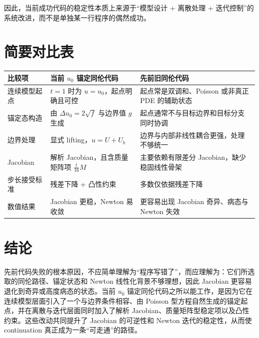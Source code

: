 \documentclass[11pt,a4paper]{article}
\begin{document}
因此，当前成功代码的稳定性本质上来源于“模型设计 + 离散处理 + 迭代控制”的系统改进，而不是单独某一行程序的偶然成功。

\section{简要对比表}
\begin{center}
\renewcommand{\arraystretch}{1.25}
\begin{tabular}{>{\raggedright\arraybackslash}p{3.0cm} >{\raggedright\arraybackslash}p{5.1cm} >{\raggedright\arraybackslash}p{5.1cm}}
\toprule
比较项 & 当前 $u_0$ 锚定同伦代码 & 先前旧同伦代码 \\
\midrule
连续模型起点 & $t=1$ 时为 $u=u_0$，起点明确且可控 & 起点常是双调和、Poisson 或非真正 PDE 的辅助状态 \\
\midrule
锚定态构造 & 由 $\Delta u_0=2\sqrt{f}$ 与边界值 $g$ 生成 & 起点通常不与目标边界和目标分支同时协调 \\
\midrule
边界处理 & 显式 lifting，$u=U+U_b$ & 边界与内部非线性耦合更强，处理不够统一 \\
\midrule
Jacobian & 解析 Jacobian，且含质量矩阵项 $\frac{t}{16}M$ & 主要依赖有限差分 Jacobian，缺少稳固线性骨架 \\
\midrule
步长接受标准 & 残差下降 + 凸性约束 & 多数仅依据残差下降 \\
\midrule
数值结果 & Jacobian 更稳，Newton 易收敛 & 更容易出现 Jacobian 奇异、病态与 Newton 失效 \\
\bottomrule
\end{tabular}
\end{center}

\section{结论}
先前代码失败的根本原因，不应简单理解为“程序写错了”，而应理解为：它们所选取的同伦路径、锚定状态和 Newton 线性化背景不够理想，因此 Jacobian 更容易退化到奇异或高度病态的状态。当前 $u_0$ 锚定同伦代码之所以能工作，是因为它在连续模型层面引入了一个与边界条件相容、由 Poisson 型方程自然生成的锚定起点，并在离散与迭代层面同时加入了解析 Jacobian、质量矩阵型稳定项以及凸性约束。这些改动共同提升了 Jacobian 的可逆性和 Newton 迭代的稳定性，从而使 continuation 真正成为一条“可走通”的路径。
\end{document}
